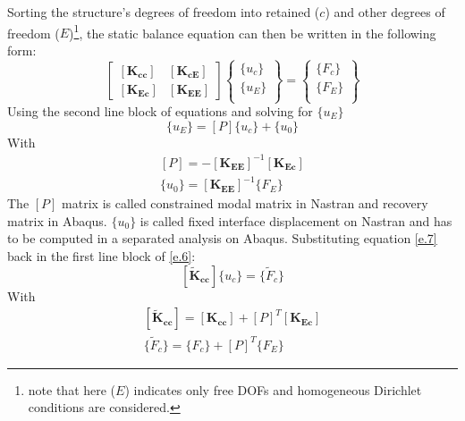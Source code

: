 Sorting the structure's degrees of freedom into retained ($c$) and other degrees of freedom ($E$)\footnote{note that here ($E$) indicates only free DOFs and homogeneous Dirichlet conditions are considered.}, the static balance equation can then be written in the following form:
\begin{equation}
\label{e.6}
\left[ \begin{array}{cc}
\left[ \mathbf{K_{cc}} \right] & \left[ \mathbf{K_{cE}} \right]\\
\left[ \mathbf{K_{Ec}} \right] & \left[ \mathbf{K_{EE}} \right]
\end{array} \right] \left\lbrace \begin{array}{c}
\lbrace u_c \rbrace\\
\lbrace u_E \rbrace\\
\end{array}\right\rbrace =  \left\lbrace \begin{array}{c}
\lbrace F_c \rbrace\\
\lbrace F_E \rbrace\\
\end{array}\right\rbrace
\end{equation}
Using the second line block of equations and solving for $\lbrace u_E \rbrace$
\begin{equation}
\label{e.7}
\lbrace u_E \rbrace =\left[ P \right]\lbrace u_c \rbrace + \lbrace u_0 \rbrace
\end{equation}
With 
\begin{eqnarray}
\left[P\right]=-\left[ \mathbf{K_{EE}}\right]^{-1} \left[\mathbf{K_{Ec}}\right] \\
\lbrace u_0 \rbrace=\left[\mathbf{K_{EE}}\right]^{-1}\lbrace F_E \rbrace
\end{eqnarray}
The $\left[P\right]$ matrix is called constrained modal matrix in Nastran and recovery matrix in Abaqus. $\lbrace u_0 \rbrace$ is called fixed interface displacement on Nastran and has to be computed in a separated analysis on Abaqus.
Substituting   equation \ref{e.7} back in the first line block of \ref{e.6}:
\begin{equation}
\label{e.10}
\left[ \mathbf{\tilde{K}_{cc}}\right]\lbrace u_c \rbrace=\lbrace \tilde{F}_c \rbrace 
\end{equation}
With 
\begin{eqnarray}
\left[ \mathbf{\tilde{K}_{cc}}\right]=\left[\mathbf{K_{cc}}\right]+ \left[ P\right]^T\left[ \mathbf{K_{Ec}}\right] \\
\lbrace \tilde{F}_c \rbrace =\lbrace F_c \rbrace + \left[ P\right]^T\lbrace F_E \rbrace
\end{eqnarray}
